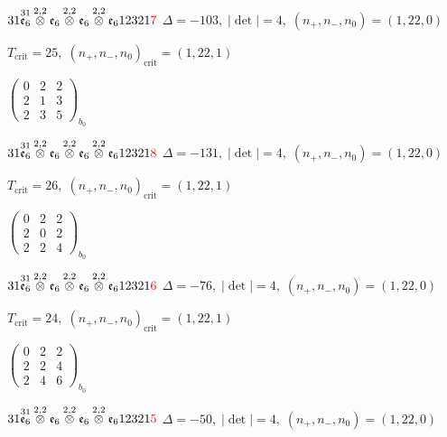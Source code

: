 \documentclass[10pt]{article}
\begin{document}
\smallskip

$31\overset{31}{\mathfrak{e}_6}\overset{2,2}{\otimes}\mathfrak{e}_6\overset{2,2}{\otimes}\mathfrak{e}_6\overset{2,2}{\otimes}\mathfrak{e}_612321\textcolor{red}{7}$ \quad $\Delta=-103,\; |\det|=4,\; (n_+,n_-,n_0)=(1,22,0)$

\hspace{1em}$T_{\text{crit}}=25,\; (n_+,n_-,n_0)_{\text{crit}}=(1,22,1)$

\hspace{2em}$\left(\begin{smallmatrix}0 & 2 & 2 \\ 2 & 1 & 3 \\ 2 & 3 & 5\end{smallmatrix}\right)_{\!b_0}$

$31\overset{31}{\mathfrak{e}_6}\overset{2,2}{\otimes}\mathfrak{e}_6\overset{2,2}{\otimes}\mathfrak{e}_6\overset{2,2}{\otimes}\mathfrak{e}_612321\textcolor{red}{8}$ \quad $\Delta=-131,\; |\det|=4,\; (n_+,n_-,n_0)=(1,22,0)$

\hspace{1em}$T_{\text{crit}}=26,\; (n_+,n_-,n_0)_{\text{crit}}=(1,22,1)$

\hspace{2em}$\left(\begin{smallmatrix}0 & 2 & 2 \\ 2 & 0 & 2 \\ 2 & 2 & 4\end{smallmatrix}\right)_{\!b_0}$

$31\overset{31}{\mathfrak{e}_6}\overset{2,2}{\otimes}\mathfrak{e}_6\overset{2,2}{\otimes}\mathfrak{e}_6\overset{2,2}{\otimes}\mathfrak{e}_612321\textcolor{red}{6}$ \quad $\Delta=-76,\; |\det|=4,\; (n_+,n_-,n_0)=(1,22,0)$

\hspace{1em}$T_{\text{crit}}=24,\; (n_+,n_-,n_0)_{\text{crit}}=(1,22,1)$

\hspace{2em}$\left(\begin{smallmatrix}0 & 2 & 2 \\ 2 & 2 & 4 \\ 2 & 4 & 6\end{smallmatrix}\right)_{\!b_0}$

$31\overset{31}{\mathfrak{e}_6}\overset{2,2}{\otimes}\mathfrak{e}_6\overset{2,2}{\otimes}\mathfrak{e}_6\overset{2,2}{\otimes}\mathfrak{e}_612321\textcolor{red}{5}$ \quad $\Delta=-50,\; |\det|=4,\; (n_+,n_-,n_0)=(1,22,0)$
\end{document}
